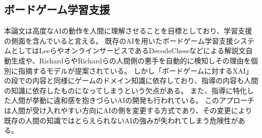 \subsection{ボードゲーム学習支援}
本論文は高度なAIの動作を人間に理解させることを目標としており、学習支援の側面を含んでいると言える。
既存のAIを用いたボードゲーム学習支援システムとしてはLeeら\cite{ChessComments}やオンラインサービスであるDecodeChess\cite{DecodeChess}などによる解説文自動生成や、Richard\cite{badMoves2016}らやRichard\cite{badMoves2017}らの人間側の悪手を自動的に検知しその理由を個別に指摘するモデルが提案されている。
しかし「ボードゲームに対するXAI」の段での内容と同様にゲームのドメイン知識に依存しており、指導の内容も人間の知識に依存したものになってしまうという欠点がある。
また、指導に特化した人間が挙動に違和感を抱きづらいAIの開発も行われている\cite{natural}\cite{maia}。
このアプローチは人間が受け入れやすい方向にAIの側を変更する方式であり、その変更により既存の人間の知識ではとらえられないAIの強みが失われてしまう危険性がある。


